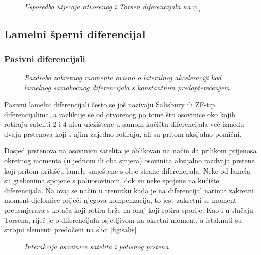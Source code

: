 \documentclass[11pt]{article}
\numberwithin{equation}{section}%
\begin{document}
\begin{figure}[h]
 \centering
 \def\svgwidth{17cm}
 
 \caption{\textit{Usporedba utjecaja otvorenog i Torsen diferencijala na} $\psi_\text{rel}$ \cite{huchtkotter1996LSD}}
 \label{fig:huch}
\end{figure} 

\newpage
	\subsection{Lamelni šperni diferencijal}
		\subsubsection{Pasivni diferencijali}

\begin{wrapfigure}{r}{0.4\textwidth}
 \centering
 \def\svgwidth{6,5cm}
 
 \caption{\textit{Razdioba zakretnog momenta ovisno o lateralnoj akceleraciji kod lamelnog samokočnog diferencijala s konstantnim predopterećenjem}}
 \label{fig:carlo}
\end{wrapfigure}
		
Pasivni lamelni diferencijali često se još nazivaju Salisbury ili ZF-tip diferencijalima, a razlikuje se od otvorenog po tome što osovinice oko kojih rotiraju sateliti 2 i 4 nisu uležištene u samom kućištu diferencijala već između dvaju prstenova koji s njim zajedno rotiraju, ali su pritom aksijalno pomični.

Dosjed prstenova na osovinicu satelita je oblikovan na način da prilikom prijenosa okretnog momenta (u jednom ili oba smjera) osovinica aksijalno razdvaja prstene koji pritom pritišću lamele smještene s obje strane diferencijala. Neke od lamela su grebenima spojene s poluosovinom, dok su neke spojene na kućište diferencijala. Na ovaj se način u trenutku kada je na diferencijal narinut zakretni moment djelomice priječi njegova kompenzacija, to jest zakretni se moment preusmjerava s kotača koji rotira brže na onaj koji rotira sporije. Kao i u slučaju Torsena, riječ je o diferencijalu osjetljivom na okretni moment, a istaknuti su strojni elementi predočeni na slici \ref{fig:salis}

\begin{figure}[b]
 \centering
 \def\svgwidth{15cm}
 
 \caption{\textit{Interakcija osovinice satelita i potisnog prstena} \cite{2023basiclars}}
 \label{fig:salis_s}
\end{figure}
\end{document}
